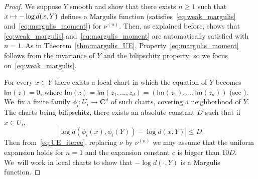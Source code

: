 \documentclass[JEP,XML,SOM,Unicode,published]{cedram}
\newcommand\mto{\mathchoice{\longmapsto}{\mapsto}{\mapsto}{\mapsto}}
\newcommand{\abs}[1]{\left\vert#1\right\vert}
\def\C{\mathbf{C}}
\newcommand{\Ima}{{\mathsf{Im}}}
\theoremstyle{plain}
\theoremstyle{definition}
\begin{document}
\begin{proof}
We suppose $Y$ smooth and show that there exists $n\geq 1$ such that
$x\mto - \log d(x, Y)$ defines a
Margulis function (\ie satisfies~\eqref{eq:weak_margulis} and~\eqref{eq:margulis_moment})
for $\nu^{(n)}$. Then, as explained before, \cite{benard-desaxce} shows that \eqref{eq:weak_margulis} and~\eqref{eq:margulis_moment} are automatically satisfied with $n=1$. As in Theorem~\ref{thm:margulis_UE}, Property~\eqref{eq:margulis_moment} follows from the invariance of $Y$ and
the bilipschitz property; so we focus on~\eqref{eq:weak_margulis}.

For every $x\in Y$ there exists a local chart in which
the equation of $Y$ becomes $\Ima (z) = 0$, where $\Ima(z) = \Ima (z_1, \ldots , z_d) =
(\Ima (z_1), \ldots , \Ima (z_d))$ (see \cite[Prop.\,1.3.8 \& 1.3.11]{BER}). We~fix
a finite family $\phi_i: U_i\to \C^d$ of such charts,
covering a neighborhood of $Y$. The charts being bilipschitz,
there exists an absolute constant $D$ such that if $x\in U_i$,
\[
\abs{\log d(\phi_i(x), \phi_i(Y)) - \log d(x,Y)}\leq D.
\] Then from~\eqref{eq:UE_iteree}, replacing
$\nu$ by $\nu^{(n)}$ we may assume that the uniform expansion holds for $n=1$ and the expansion
constant $c$ is bigger than $10D$. We~will work in local charts to show that $-\log d(\cdot, Y)$ is a Margulis function.


\end{proof}
\end{document}
